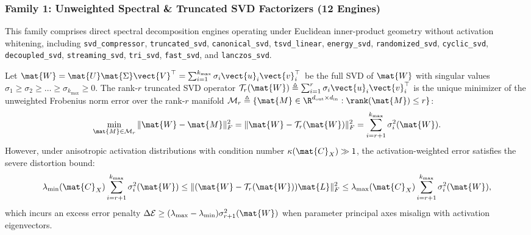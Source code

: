 \subsubsection{Family 1: Unweighted Spectral \& Truncated SVD Factorizers (12 Engines)}
This family comprises direct spectral decomposition engines operating under Euclidean inner-product geometry without activation whitening, including \texttt{svd\_compressor}, \texttt{truncated\_svd}, \texttt{canonical\_svd}, \texttt{tsvd\_linear}, \texttt{energy\_svd}, \texttt{randomized\_svd}, \texttt{cyclic\_svd}, \texttt{decoupled\_svd}, \texttt{streaming\_svd}, \texttt{tri\_svd}, \texttt{fast\_svd}, and \texttt{lanczos\_svd}.
\begin{theorem}
\label{thm:frob_unweighted_svd}
Let $\mat{W} = \mat{U} \mat{\Sigma} \vect{V}^\top = \sum_{i=1}^{k_{\max}} \sigma_i \vect{u}_i \vect{v}_i^\top$ be the full SVD of $\mat{W}$ with singular values $\sigma_1 \ge \sigma_2 \ge \dots \ge \sigma_{k_{\max}} \ge 0$. The rank-$r$ truncated SVD operator $\mathcal{T}_r(\mat{W}) \triangleq \sum_{i=1}^r \sigma_i \vect{u}_i \vect{v}_i^\top$ is the unique minimizer of the unweighted Frobenius norm error over the rank-$r$ manifold $\mathcal{M}_r \triangleq \{\mat{M} \in \R^{d_{\text{out}} \times d_{\text{in}}} : \rank(\mat{M}) \le r\}$:
\begin{equation}
\min_{\mat{M} \in \mathcal{M}_r} \|\mat{W} - \mat{M}\|_F^2 = \|\mat{W} - \mathcal{T}_r(\mat{W})\|_F^2 = \sum_{i=r+1}^{k_{\max}} \sigma_i^2(\mat{W}).
\label{eq:frob_bound_svd_family}
\end{equation}
However, under anisotropic activation distributions with condition number $\kappa(\mat{C}_X) \gg 1$, the activation-weighted error satisfies the severe distortion bound:
\begin{equation}
\lambda_{\min}(\mat{C}_X) \sum_{i=r+1}^{k_{\max}} \sigma_i^2(\mat{W}) \le \|(\mat{W} - \mathcal{T}_r(\mat{W}))\mat{L}\|_F^2 \le \lambda_{\max}(\mat{C}_X) \sum_{i=r+1}^{k_{\max}} \sigma_i^2(\mat{W}),
\end{equation}
which incurs an excess error penalty $\Delta \mathcal{E} \ge (\lambda_{\max} - \lambda_{\min}) \sigma_{r+1}^2(\mat{W})$ when parameter principal axes misalign with activation eigenvectors.
\end{theorem}

